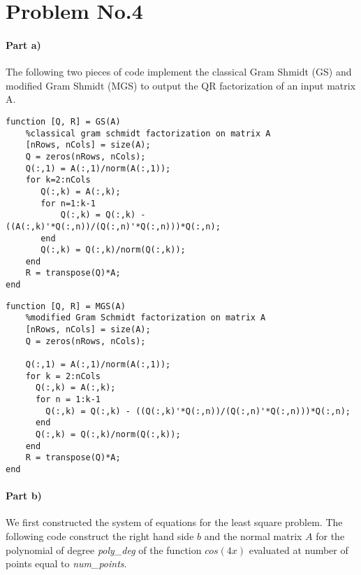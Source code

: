 \section*{Problem No.4} \label{sec:prob4}

\paragraph{Part a)} The following two pieces of code implement the classical Gram Shmidt (GS) and modified Gram Shmidt (MGS) to output the QR factorization of an input matrix A.

\begin{lstlisting}
function [Q, R] = GS(A)
    %classical gram schmidt factorization on matrix A    
    [nRows, nCols] = size(A);
    Q = zeros(nRows, nCols);
    Q(:,1) = A(:,1)/norm(A(:,1));
    for k=2:nCols
       Q(:,k) = A(:,k);
       for n=1:k-1
           Q(:,k) = Q(:,k) - ((A(:,k)'*Q(:,n))/(Q(:,n)'*Q(:,n)))*Q(:,n);
       end
       Q(:,k) = Q(:,k)/norm(Q(:,k));
    end
    R = transpose(Q)*A;
end
\end{lstlisting}


\begin{lstlisting}
function [Q, R] = MGS(A)
    %modified Gram Schmidt factorization on matrix A
    [nRows, nCols] = size(A);
    Q = zeros(nRows, nCols);
    
    Q(:,1) = A(:,1)/norm(A(:,1));
    for k = 2:nCols
      Q(:,k) = A(:,k);
      for n = 1:k-1
        Q(:,k) = Q(:,k) - ((Q(:,k)'*Q(:,n))/(Q(:,n)'*Q(:,n)))*Q(:,n);
      end
      Q(:,k) = Q(:,k)/norm(Q(:,k));
    end    
    R = transpose(Q)*A;
end
\end{lstlisting}

\paragraph{Part b)} We first constructed the system of equations for the least square problem. The following code construct the right hand side $b$ and the normal matrix $A$ for the polynomial of degree \emph{poly\_deg} of the function $cos(4x)$ evaluated at number of points equal to \emph{num\_points}.

